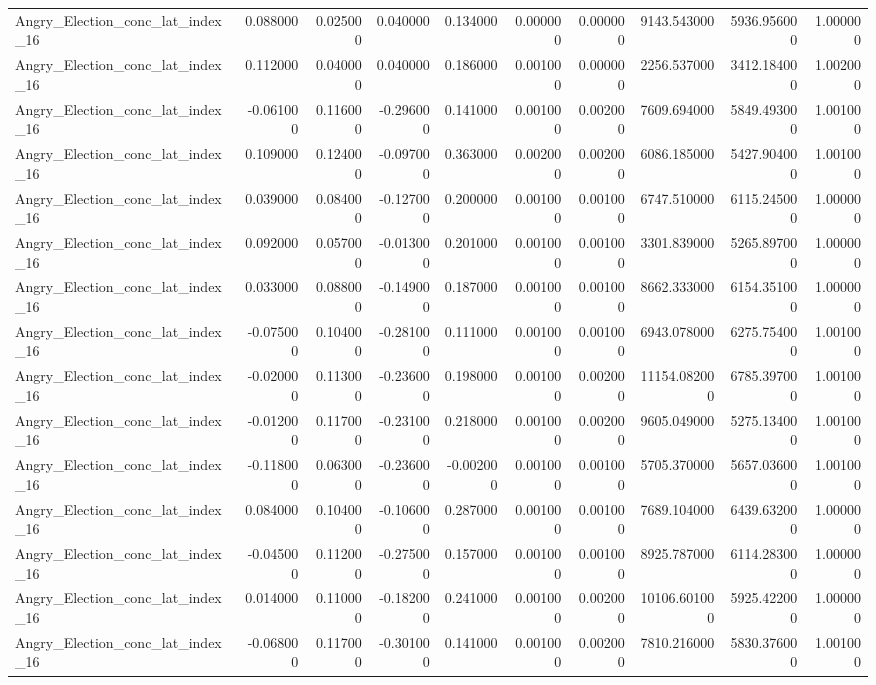 \begin{table}
\begin{tabular}{lrrrrrrrrr}
Angry_Election_conc_lat_index_16 & 0.088000 & 0.025000 & 0.040000 & 0.134000 & 0.000000 & 0.000000 & 9143.543000 & 5936.956000 & 1.000000 \\
Angry_Election_conc_lat_index_16 & 0.112000 & 0.040000 & 0.040000 & 0.186000 & 0.001000 & 0.000000 & 2256.537000 & 3412.184000 & 1.002000 \\
Angry_Election_conc_lat_index_16 & -0.061000 & 0.116000 & -0.296000 & 0.141000 & 0.001000 & 0.002000 & 7609.694000 & 5849.493000 & 1.001000 \\
Angry_Election_conc_lat_index_16 & 0.109000 & 0.124000 & -0.097000 & 0.363000 & 0.002000 & 0.002000 & 6086.185000 & 5427.904000 & 1.001000 \\
Angry_Election_conc_lat_index_16 & 0.039000 & 0.084000 & -0.127000 & 0.200000 & 0.001000 & 0.001000 & 6747.510000 & 6115.245000 & 1.000000 \\
Angry_Election_conc_lat_index_16 & 0.092000 & 0.057000 & -0.013000 & 0.201000 & 0.001000 & 0.001000 & 3301.839000 & 5265.897000 & 1.000000 \\
Angry_Election_conc_lat_index_16 & 0.033000 & 0.088000 & -0.149000 & 0.187000 & 0.001000 & 0.001000 & 8662.333000 & 6154.351000 & 1.000000 \\
Angry_Election_conc_lat_index_16 & -0.075000 & 0.104000 & -0.281000 & 0.111000 & 0.001000 & 0.001000 & 6943.078000 & 6275.754000 & 1.001000 \\
Angry_Election_conc_lat_index_16 & -0.020000 & 0.113000 & -0.236000 & 0.198000 & 0.001000 & 0.002000 & 11154.082000 & 6785.397000 & 1.001000 \\
Angry_Election_conc_lat_index_16 & -0.012000 & 0.117000 & -0.231000 & 0.218000 & 0.001000 & 0.002000 & 9605.049000 & 5275.134000 & 1.001000 \\
Angry_Election_conc_lat_index_16 & -0.118000 & 0.063000 & -0.236000 & -0.002000 & 0.001000 & 0.001000 & 5705.370000 & 5657.036000 & 1.001000 \\
Angry_Election_conc_lat_index_16 & 0.084000 & 0.104000 & -0.106000 & 0.287000 & 0.001000 & 0.001000 & 7689.104000 & 6439.632000 & 1.000000 \\
Angry_Election_conc_lat_index_16 & -0.045000 & 0.112000 & -0.275000 & 0.157000 & 0.001000 & 0.001000 & 8925.787000 & 6114.283000 & 1.000000 \\
Angry_Election_conc_lat_index_16 & 0.014000 & 0.110000 & -0.182000 & 0.241000 & 0.001000 & 0.002000 & 10106.601000 & 5925.422000 & 1.000000 \\
Angry_Election_conc_lat_index_16 & -0.068000 & 0.117000 & -0.301000 & 0.141000 & 0.001000 & 0.002000 & 7810.216000 & 5830.376000 & 1.001000 \\

\end{tabular}
\end{table}
